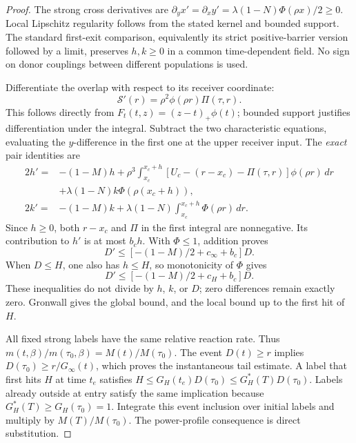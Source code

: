 \documentclass[11pt]{article}
\numberwithin{equation}{section}
\theoremstyle{remark}\newtheorem{remark}[theorem]{Remark}
\newcommand{\dd}{\,d}
\newcommand{\1}{\mathbf 1}
\begin{document}
\begin{proof}
The strong cross derivatives are
$\partial_yx'=\partial_xy'=\lambda(1-N)\Phi(\rho x)/2\ge0$.
Local Lipschitz regularity follows from the stated kernel and bounded
support. The standard first-exit comparison, equivalently its strict
positive-barrier version followed by a limit, preserves $h,k\ge0$ in a
common time-dependent field. No sign on donor couplings between different
populations is used.

Differentiate the overlap with respect to its receiver coordinate:
\[
 \mathcal S'(r)=\rho^2\phi(\rho r)\Pi(\tau,r).
\]
This follows directly from $F_t(t,z)=(z-t)_+\phi(t)$; bounded support
justifies differentiation under the integral. Subtract the two
characteristic equations, evaluating the $y$-difference in the first
one at the upper receiver input. The \emph{exact} pair identities are
\begin{align}
 2h'={}&-(1-M)h+
 \rho^3\int_{x_c}^{x_c+h}
 [U_c-(r-x_c)-\Pi(\tau,r)]\phi(\rho r)\dd r\nonumber\\
 &+\lambda(1-N)k\Phi(\rho(x_c+h)),\label{inc:AN02:tail:v1:exactpair}\\
 2k'={}&-(1-M)k+
 \lambda(1-N)\int_{x_c}^{x_c+h}\Phi(\rho r)\dd r.\nonumber
\end{align}
Since $h\ge0$, both $r-x_c$ and $\Pi$ in the first integral are
nonnegative. Its contribution to $h'$ is at most $b_ch$.
With $\Phi\le1$, addition proves
\[
 D'\le[-(1-M)/2+c_\infty+b_c]D.
\]
When $D\le H$, one also has $h\le H$, so monotonicity of $\Phi$ gives
\[
 D'\le[-(1-M)/2+c_H+b_c]D.
\]
These inequalities do not divide by $h$, $k$, or $D$; zero differences
remain exactly zero. Gronwall gives the global bound, and the local bound
up to the first hit of $H$.

All fixed strong labels have the same relative reaction rate. Thus
$m(t,\beta)/m(\tau_0,\beta)=M(t)/M(\tau_0)$.
The event $D(t)\ge r$ implies $D(\tau_0)\ge r/G_\infty(t)$,
which proves the instantaneous tail estimate. A label that first hits $H$
at time $t_e$ satisfies
$H\le G_H(t_e)D(\tau_0)\le G_H^*(T)D(\tau_0)$.
Labels already outside at entry satisfy the same implication because
$G_H^*(T)\ge G_H(\tau_0)=1$. Integrate this event inclusion over initial
labels and multiply by $M(T)/M(\tau_0)$.
The power-profile consequence is direct substitution.
\end{proof}
\end{document}
